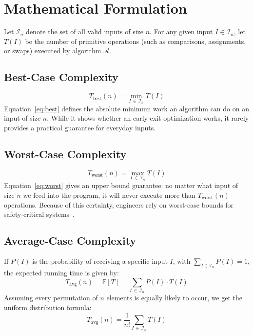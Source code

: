 \documentclass[11pt,a4paper]{article}
\begin{document}
\section{Mathematical Formulation}

Let $\mathcal{I}_n$ denote the set of all valid inputs of size $n$. For any given
input $I \in \mathcal{I}_n$, let $T(I)$ be the number of primitive operations (such
as comparisons, assignments, or swaps) executed by algorithm $\mathcal{A}$.

\subsection{Best-Case Complexity}
\begin{equation}
  T_{\text{best}}(n) = \min_{I\,\in\,\mathcal{I}_n} T(I)
  \label{eq:best}
\end{equation}
Equation~\eqref{eq:best} defines the absolute minimum work an algorithm can do on an
input of size $n$. While it shows whether an early-exit optimization works, it rarely
provides a practical guarantee for everyday inputs.

\subsection{Worst-Case Complexity}
\begin{equation}
  T_{\text{worst}}(n) = \max_{I\,\in\,\mathcal{I}_n} T(I)
  \label{eq:worst}
\end{equation}
Equation~\eqref{eq:worst} gives an upper bound guarantee: no matter what input of
size $n$ we feed into the program, it will never execute more than $T_{\text{worst}}(n)$
operations. Because of this certainty, engineers rely on worst-case bounds for
safety-critical systems~\cite{cormen2022}.

\subsection{Average-Case Complexity}
If $P(I)$ is the probability of receiving a specific input $I$, with
$\sum_{I\in\mathcal{I}_n}P(I)=1$, the expected running time is given by:
\begin{equation}
  T_{\text{avg}}(n)
    = \mathbb{E}[T]
    = \sum_{I\,\in\,\mathcal{I}_n} P(I)\cdot T(I)
  \label{eq:avg}
\end{equation}
Assuming every permutation of $n$ elements is equally likely to occur, we get the
uniform distribution formula:
\begin{equation}
  T_{\text{avg}}(n) = \frac{1}{n!}\sum_{I\,\in\,\mathcal{I}_n} T(I)
  \label{eq:avguniform}
\end{equation}
\end{document}
